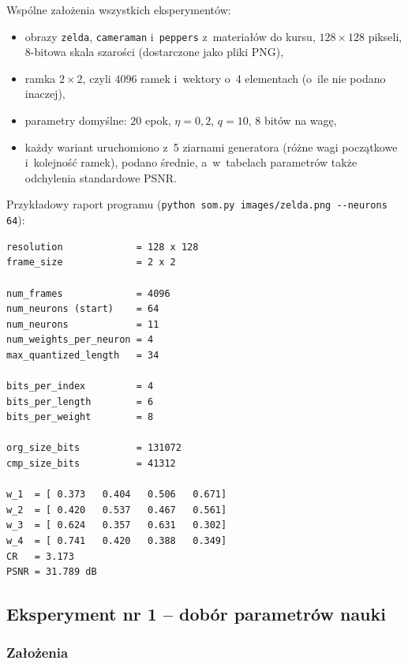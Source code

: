 \documentclass[12pt]{article}
\begin{document}
Wspólne założenia wszystkich eksperymentów:
\begin{itemize}
 \item obrazy \texttt{zelda}, \texttt{cameraman} i~\texttt{peppers} z~materiałów do kursu,
       $128\times128$ pikseli, 8-bitowa skala szarości (dostarczone jako pliki PNG),
 \item ramka $2\times2$, czyli $4096$ ramek i~wektory o~4 elementach (o~ile nie podano inaczej),
 \item parametry domyślne: $20$ epok, $\eta=0{,}2$, $q=10$, 8 bitów na wagę,
 \item każdy wariant uruchomiono z~5 ziarnami generatora (różne wagi początkowe i~kolejność ramek),
       podano średnie, a~w~tabelach parametrów także odchylenia standardowe PSNR.
\end{itemize}

Przykładowy raport programu (\texttt{python som.py images/zelda.png -{}-neurons 64}):
\begin{lstlisting}
resolution             = 128 x 128
frame_size             = 2 x 2

num_frames             = 4096
num_neurons (start)    = 64
num_neurons            = 11
num_weights_per_neuron = 4
max_quantized_length   = 34

bits_per_index         = 4
bits_per_length        = 6
bits_per_weight        = 8

org_size_bits          = 131072
cmp_size_bits          = 41312

w_1  = [ 0.373   0.404   0.506   0.671]
w_2  = [ 0.420   0.537   0.467   0.561]
w_3  = [ 0.624   0.357   0.631   0.302]
w_4  = [ 0.741   0.420   0.388   0.349]
CR   = 3.173
PSNR = 31.789 dB
\end{lstlisting}


\subsection{Eksperyment nr 1 -- dobór parametrów nauki}

\subsubsection{Założenia}
\end{document}
